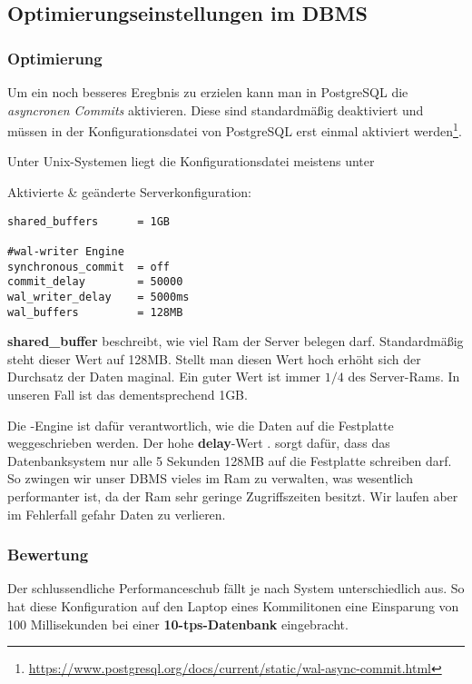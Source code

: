 \subsection{Optimierungseinstellungen im DBMS}
\subsubsection*{Optimierung}
Um ein noch besseres Eregbnis zu erzielen kann man in PostgreSQL die
\textit{asyncronen Commits} aktivieren. Diese sind standardmäßig deaktiviert
und müssen in der Konfigurationsdatei von PostgreSQL erst einmal aktiviert
werden\footnote{\url{https://www.postgresql.org/docs/current/static/wal-async-commit.html}}.

Unter Unix-Systemen liegt die Konfigurationsdatei meistens unter \newline
{}

Aktivierte \& geänderte Serverkonfiguration:
\begin{lstlisting}[title={Veränderte Serverkonfiguration}]
shared_buffers		= 1GB

#wal-writer Engine
synchronous_commit	= off
commit_delay		= 50000
wal_writer_delay	= 5000ms
wal_buffers			= 128MB
\end{lstlisting}

\textbf{shared\_buffer} beschreibt, wie viel Ram der Server belegen darf.
Standardmäßig steht dieser Wert auf 128MB. Stellt man diesen Wert hoch erhöht
sich der Durchsatz der Daten maginal. Ein guter Wert ist immer $1/4$ des
Server-Rams. In unseren Fall ist das dementsprechend 1GB.

Die -Engine ist dafür verantwortlich, wie die Daten auf die
Festplatte weggeschrieben werden. Der hohe \textbf{delay}-Wert \zB. sorgt
dafür, dass das Datenbanksystem nur alle 5 Sekunden 128MB auf die Festplatte
schreiben darf. So zwingen wir unser DBMS vieles im Ram zu verwalten, was
wesentlich performanter ist, da der Ram sehr geringe Zugriffszeiten besitzt. Wir
laufen aber im Fehlerfall gefahr Daten zu verlieren.

\subsubsection*{Bewertung}
Der schlussendliche Performanceschub fällt je nach System unterschiedlich aus.
So hat diese Konfiguration auf den Laptop eines Kommilitonen eine Einsparung von 100
Millisekunden bei einer \textbf{10-tps-Datenbank} eingebracht.

